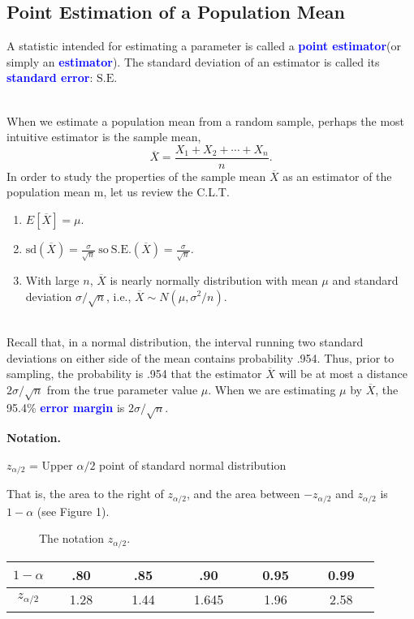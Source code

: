\documentclass[12pt,openany]{book}
\theoremstyle{definition}
\newcommand{\dispsty}{\displaystyle}
\newcommand{\sd}{\text{sd}}
\newcommand{\SE}{\text{S.E.}}
\begin{document}
	\subsection{Point Estimation of a Population Mean}
	\begin{tcolorbox}[colback=white]
		A statistic intended for estimating a parameter is called a \textcolor{blue}{\bf point estimator}(or simply an \textcolor{blue}{\bf estimator}).
		The standard deviation of an estimator is called its \textcolor{blue}{\bf standard error}: $\SE$
	\end{tcolorbox}\
	\\
	When we estimate a population mean from a random sample, perhaps the most intuitive estimator is the sample mean,
	\[
	\overline{X} = \frac{X_1+X_2+\cdots+X_n}{n}.
	\]
	In order to study the properties of the sample mean $\overline{X}$ as an estimator of the population mean m, let us review the C.L.T. \begin{enumerate}
		\item \(E[\overline{X}]=\mu\).
		\item \(\dispsty\sd(\overline{X})=\frac{\sigma}{\sqrt{n}}\ \text{so}\ \SE(\overline{X})=\frac{\sigma}{\sqrt{n}} \).
		\item With large $n$, $\overline{X}$ is nearly normally distribution with mean $\mu$ and standard deviation $\sigma/\sqrt{n}$, i.e., $\overline{X}\sim N(\mu, \sigma^2/n)$.
	\end{enumerate}\
	\\
	Recall that, in a normal distribution, the interval running two standard deviations on either side of the mean
	contains probability .954. Thus, prior to sampling, the probability is .954 that the estimator $\overline{X}$ will be at most a distance $2\sigma/\sqrt{n}$ from the true parameter value $\mu$. When we are estimating $\mu$ by $\overline{X}$, the 95.4\% \textcolor{blue}{\bf error margin} is $2\sigma/\sqrt{n}$.
	
	\begin{tcolorbox}[colback=white]
		\textbf{Notation.}\begin{center}
			$z_{\alpha/2}$ = Upper $\alpha/2$ point of standard normal distribution
		\end{center} That is, the area to the right of $z_{\alpha/2}$, and the area between $-z_{\alpha/2}$ and $z_{\alpha/2}$ is $1-\alpha$ (see Figure 1).
	\end{tcolorbox}
	\begin{figure}[h!]
		\centering
		\caption{The notation $z_{\alpha/2}$.}
	\end{figure}
	\begin{center}\begin{tabular}{c||ccc|ccc|ccc|ccc|ccc}
			\toprule[1.5pt]
			$1-\alpha$ && .80 &&& .85 &&& .90 &&& 0.95 &&& 0.99 &\\
			\hline
			$z_{\alpha/2}$ && 1.28 &&& 1.44 &&& 1.645 &&& 1.96 &&& 2.58 &\\
			\bottomrule[1.5pt]
		\end{tabular}
	\end{center}
	
\end{document}
